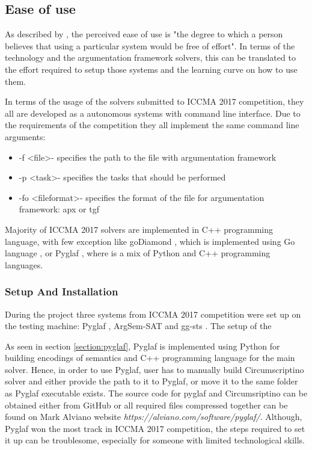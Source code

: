 
\subsection{Ease of use}
As described by \citet{easeOfUse}, the perceived ease of use is "the degree to which a person believes that using a particular system would be free of effort". In terms of the technology and the argumentation framework solvers, this can be translated to the effort required to setup those systems and the learning curve on how to use them. 

In terms of the usage of the solvers submitted to ICCMA 2017 competition, they all are developed as a autonomous systems with command line interface. Due to the requirements of the competition they all implement the same command line arguments:

\begin{itemize}
	\item -f \textless file\textgreater - specifies the path to the file with argumentation framework
	\item -p \textless task\textgreater - specifies the tasks that should be performed
	\item -fo \textless fileformat\textgreater - specifies the format of the file for argumentation framework: apx or tgf
\end{itemize}

Majority of ICCMA 2017 solvers are implemented in C++ programming language, with few exception like goDiamond \citep{goDiamond}, which is implemented using Go language \citep{GoLang}, or Pyglaf \citep{pyglaf}, where is a mix of Python and C++ programming languages. 



\subsubsection{Setup And Installation}
During the project three systems from ICCMA 2017 competition were set up on the testing machine: Pyglaf \citep{pyglaf}, ArgSem-SAT \citep{argsemsat} and gg-sts \citep{gg-sts}. The setup of the 

As seen in section \ref{section:pyglaf}, Pyglaf is implemented using Python for building encodings of semantics and C++ programming language for the main solver. Hence, in order to use Pyglaf, user has to manually build Circumscriptino \citep{circumscriptino} solver and either provide the path to it to Pyglaf, or move it to the same folder as Pyglaf executable exists. The source code for pyglaf and Circumsriptino can be obtained either from GitHub or all required files compressed together can be found on Mark Alviano website \textit{https://alviano.com/software/pyglaf/}. Although, Pyglaf won the most track in ICCMA 2017 competition, the steps required to set it up can be troublesome, especially for someone with limited technological skills. 


